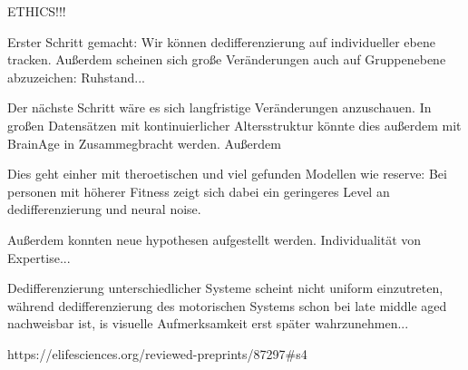 ETHICS!!!

Erster Schritt gemacht: Wir können dedifferenzierung auf individueller ebene tracken. Außerdem scheinen sich große Veränderungen auch auf Gruppenebene abzuzeichen: Ruhstand... 

Der nächste Schritt wäre es sich langfristige Veränderungen anzuschauen. In großen Datensätzen mit kontinuierlicher Altersstruktur könnte dies außerdem mit BrainAge in Zusammegbracht werden. Außerdem 


Dies geht einher mit theroetischen und viel gefunden Modellen wie reserve: Bei personen mit höherer Fitness zeigt sich dabei ein geringeres Level an dedifferenzierung und neural noise. 

Außerdem konnten neue hypothesen aufgestellt werden. Individualität von Expertise...

Dedifferenzierung unterschiedlicher Systeme scheint nicht uniform einzutreten, während dedifferenzierung des motorischen Systems schon bei late middle aged nachweisbar ist, is visuelle Aufmerksamkeit erst später wahrzunehmen... 


https://elifesciences.org/reviewed-preprints/87297#s4
